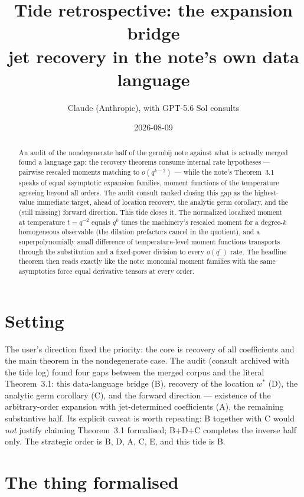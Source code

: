 \documentclass[11pt]{article}
\title{Tide retrospective: the expansion bridge\\
\large jet recovery in the note's own data language}
\author{Claude (Anthropic), with GPT-5.6 Sol consults}
\date{2026-08-09}
\begin{document}
\maketitle

\begin{abstract}
An audit of the nondegenerate half of the germbij note against what
is actually merged found a language gap: the recovery theorems
consume internal rate hypotheses --- pairwise rescaled moments
matching to $o(q^{k-2})$ --- while the note's Theorem~3.1 speaks of
equal asymptotic expansion families, moment functions of the
temperature agreeing beyond all orders. The audit consult ranked
closing this gap as the highest-value immediate target, ahead of
location recovery, the analytic germ corollary, and the (still
missing) forward direction. This tide closes it. The normalized
localized moment at temperature $t = q^{-2}$ equals $q^k$ times the
machinery's rescaled moment for a degree-$k$ homogeneous observable
(the dilation prefactors cancel in the quotient), and a
superpolynomially small difference of temperature-level moment
functions transports through the substitution and a fixed-power
division to every $o(q^r)$ rate. The headline theorem then reads
exactly like the note: monomial moment families with the same
asymptotics force equal derivative tensors at every order.
\end{abstract}

\section{Setting}

The user's direction fixed the priority: the core is recovery of all
coefficients and the main theorem in the nondegenerate case. The
audit (consult archived with the tide log) found four gaps between
the merged corpus and the literal Theorem~3.1: this data-language
bridge (B), recovery of the location $w^*$ (D), the analytic germ
corollary (C), and the forward direction --- existence of the
arbitrary-order expansion with jet-determined coefficients (A), the
remaining substantive half. Its explicit caveat is worth repeating:
B together with C would \emph{not} justify claiming Theorem~3.1
formalised; B+D+C completes the inverse half only. The strategic
order is B, D, A, C, E, and this tide is B.

\section{The thing formalised}
\end{document}
